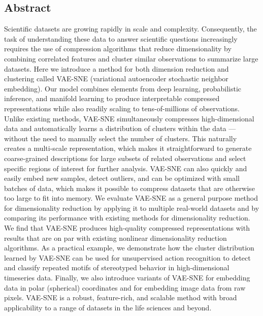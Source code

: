 \documentclass[11pt,a4paper,twoside]{book}
\begin{document}
\begin{doublespace}
\section{Abstract}

Scientific datasets are growing rapidly in scale and complexity. Consequently, the task of understanding these data to answer scientific questions increasingly requires the use of compression algorithms that
reduce dimensionality by combining correlated features and cluster similar observations to summarize
large datasets. Here we introduce a method for both dimension reduction and clustering called
VAE-SNE (variational autoencoder stochastic neighbor embedding). Our model combines elements from
deep learning, probabilistic inference, and manifold learning to produce interpretable compressed
representations while also readily scaling to tens-of-millions of observations. Unlike existing methods,
VAE-SNE simultaneously compresses high-dimensional data and automatically learns a distribution of
clusters within the data — without the need to manually select the number of clusters. This naturally
creates a multi-scale representation, which makes it straightforward to generate coarse-grained
descriptions for large subsets of related observations and select specific regions of interest for further
analysis. VAE-SNE can also quickly and easily embed new samples, detect outliers, and can be optimized
with small batches of data, which makes it possible to compress datasets that are otherwise too large to
fit into memory. We evaluate VAE-SNE as a general purpose method for dimensionality reduction by
applying it to multiple real-world datasets and by comparing its performance with existing methods for
dimensionality reduction. We find that VAE-SNE produces high-quality compressed representations with
results that are on par with existing nonlinear dimensionality reduction algorithms. As a practical
example, we demonstrate how the cluster distribution learned by VAE-SNE can be used for unsupervised
action recognition to detect and classify repeated motifs of stereotyped behavior in high-dimensional
timeseries data. Finally, we also introduce variants of VAE-SNE for embedding data in polar (spherical)
coordinates and for embedding image data from raw pixels. VAE-SNE is a robust, feature-rich, and
scalable method with broad applicability to a range of datasets in the life sciences and beyond.


\end{doublespace}
\end{document}
